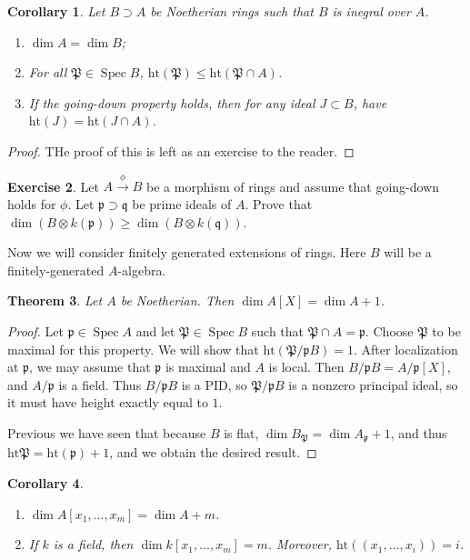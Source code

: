 \documentclass[leqno, openany]{memoir}
\newtheorem{thm}{Theorem}[section]
\newtheorem{cor}[thm]{Corollary}
\theoremstyle{definition}
\newtheorem{exer}[thm]{Exercise}
\theoremstyle{remark}
\theoremstyle{plain}
\theoremstyle{definition}
\theoremstyle{remark}
\newcommand{\mf}[1]{\mathfrak{#1}}
\newcommand{\mr}[1]{\mathrm{#1}}
\DeclareMathOperator{\Spec}{Spec}
\begin{document}
\begin{cor}
    Let $B \supset A$ be Noetherian rings such that $B$ is inegral over $A$.
    \begin{enumerate}
        \item $\dim A = \dim B$;
        \item For all $\mf{P} \in \Spec B$, $\mr{ht}(\mf{P}) \leq \mr{ht}(\mf{P} \cap A)$.
        \item If the going-down property holds, then for any ideal $J \subset B$, have $\mr{ht}(J) = \mr{ht}(J \cap A)$.
    \end{enumerate}
\end{cor}

\begin{proof}
    THe proof of this is left as an exercise to the reader.
\end{proof}

\begin{exer}
    Let $A \xrightarrow{\phi} B$ be a morphism of rings and assume that going-down holds for $\phi$. Let $\mf{p} \supset \mf{q}$ be prime ideals of $A$. Prove that $\dim(B \otimes k(\mf{p})) \geq \dim(B \otimes k(\mf{q}))$.
\end{exer}

Now we will consider finitely generated extensions of rings. Here $B$ will be a finitely-generated $A$-algebra.

\begin{thm}
    Let $A$ be Noetherian. Then $\dim A[X] = \dim A + 1$.
\end{thm}

\begin{proof}
    Let $\mf{p} \in \Spec A$ and let $\mf{P} \in \Spec B$ such that $\mf{P} \cap A = \mf{p}$. Choose $\mf{P}$ to be maximal for this property. We will show that $\mr{ht}(\mf{P} / \mf{p}B) = 1$. After localization at $\mf{p}$, we may assume that $\mf{p}$ is maximal and $A$ is local. Then $B / \mf{p}B = A/\mf{p}[X]$, and $A / \mf{p}$ is a field. Thus $B / \mf{p}B$ is a PID, so $\mf{P} / \mf{p}B$ is a nonzero principal ideal, so it must have height exactly equal to $1$.

    Previous we have seen that because $B$ is flat, $\dim B_{\mf{P}} = \dim A_{\mf{p}} + 1$, and thus $\mr{ht}\mf{P} = \mr{ht}(\mf{p}) + 1$, and we obtain the desired result.
\end{proof}

\begin{cor}
    \begin{enumerate}
        \item $\dim A[x_1, \ldots, x_m] = \dim A + m$.
        \item If $k$ is a field, then $\dim k[x_1, \ldots, x_m] = m$. Moreover, $\mr{ht}((x_1, \ldots, x_i)) = i$.
    \end{enumerate}
\end{cor}
\end{document}
